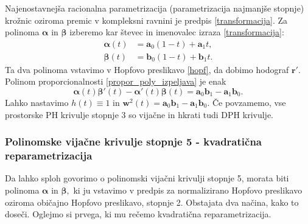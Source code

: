 \documentclass[12pt,a4paper,twoside]{article}
\theoremstyle{definition} %
\theoremstyle{plain} %
\theoremstyle{primerstyle}
\numberwithin{equation}{section}  %
\newcommand{\aV}{\mathbf{a}}
\newcommand{\bV}{\mathbf{b}}
\newcommand{\rV}{\mathbf{r}}
\newcommand{\wV}{\mathbf{w}}
\newcommand{\balpha}{\boldsymbol \alpha}
\newcommand{\bbeta}{\boldsymbol \beta}
\begin{document}
Najenostavnejša racionalna parametrizacija (parametrizacija najmanjše stopnje)\\krožnic oziroma premic v kompleksni ravnini je predpis \eqref{transformacija}. Za polinoma $\balpha$ in $\bbeta$ izberemo kar števec in imenovalec izraza \eqref{transformacija}:
\begin{align*}
	\balpha(t)&=\aV_0(1-t)+\aV_1t,\\
	\bbeta(t)&=\bV_0(1-t)+\bV_1t.
\end{align*}
Ta dva polinoma vstavimo v Hopfovo preslikavo \eqref{hopf}, da dobimo hodograf $\rV'.$ Polinom proporcionalnosti \eqref{propor_poly_izpeljava} je enak
\begin{equation*}
	\balpha(t)\bbeta'(t)-\balpha'(t)\bbeta(t)=\aV_0\bV_1-\aV_1\bV_0.
\end{equation*}
Lahko nastavimo $h(t)\equiv1$ in $\wV^2(t)=\aV_0\bV_1-\aV_1\bV_0.$ Če povzamemo, vse prostorske PH krivulje stopnje 3 so vijačne in hkrati tudi DPH krivulje. %

\subsubsection{Polinomske vijačne krivulje stopnje 5 - kvadratična reparametrizacija}
\label{kvadraticna_reparametrizacija_5}

Da lahko sploh govorimo o polinomski vijačni krivulji stopnje 5, morata biti polinoma $\balpha$ in $\bbeta,$ ki ju vstavimo v predpis za normalizirano Hopfovo preslikavo oziroma običajno Hopfovo preslikavo, stopnje 2. Obstajata dva načina, kako to doseči. Oglejmo si prvega, ki mu rečemo kvadratična reparametrizacija.
\end{document}
